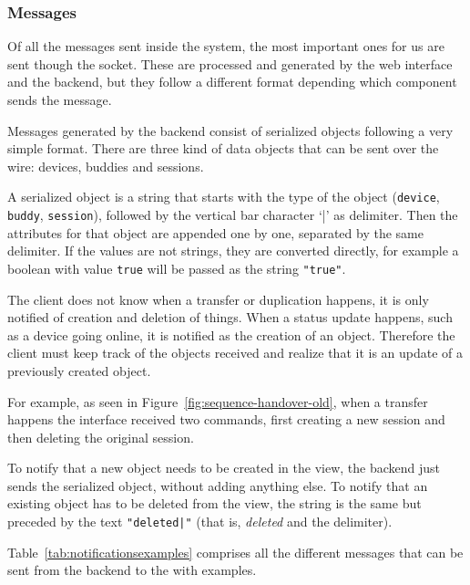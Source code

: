 \subsubsection{Messages} %
\label{ssub:messagesold}

Of all the messages sent inside the system, the most important ones for us are sent though the  socket.
These are processed and generated by the web interface and the  backend, but they follow a different format depending which component sends the message.

Messages generated by the backend consist of serialized objects following a very simple format.
There are three kind of data objects that can be sent over the wire: devices, buddies and sessions.

A serialized object is a string that starts with the type of the object (\texttt{device}, \texttt{buddy}, \texttt{session}), followed by the vertical bar character `|' as delimiter.
Then the attributes for that object are appended one by one, separated by the same delimiter.
If the values are not strings, they are converted directly, for example a boolean with value \texttt{true} will be passed as the string \texttt{"true"}.

The client does not know when a transfer or duplication happens, it is only notified of creation and deletion of things.
When a status update happens, such as a device going online, it is notified as the creation of an object.
Therefore the client must keep track of the objects received and realize that it is an update of a previously created object.

For example, as seen in Figure~\ref{fig:sequence-handover-old}, when a transfer happens the interface received two commands, first creating a new session and then deleting the original session.

To notify that a new object needs to be created in the view, the backend just sends the serialized object, without adding anything else.
To notify that an existing object has to be deleted from the view, the string is the same but preceded by the text \texttt{"deleted|"} (that is, \emph{deleted} and the delimiter).

Table~\ref{tab:notificationsexamples} comprises all the different messages that can be sent from the  backend to the  with examples.

